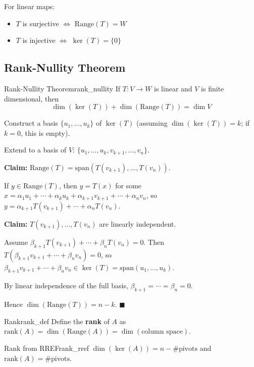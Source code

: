 \documentclass[11pt, letterpaper, openany]{book}
\renewenvironment{proof}[1][\proofname]{%
  \tcolorbox[blanker, breakable, left=1em,
    before skip=1em, after skip=1em,
    borderline west={2pt}{0pt}{MagicTeal!50},
    colback=MagicCream,
    before upper={\textcolor{MagicTeal}{\sffamily\bfseries #1.}\space}
  ]%
}{%
  \hfill\textcolor{MagicTeal}{\ensuremath{\blacksquare}}\endtcolorbox%
}
\begin{document}
\begin{remark}
For linear maps:
\begin{itemize}
    \item $T$ is surjective $\Leftrightarrow$ $\text{Range}(T) = W$
    \item $T$ is injective $\Leftrightarrow$ $\ker(T) = \{0\}$
\end{itemize}
\end{remark}

\subsection{Rank-Nullity Theorem}

\begin{thm}{Rank-Nullity Theorem}{rank_nullity}
If $T: V \to W$ is linear and $V$ is finite dimensional, then
\[\dim(\ker(T)) + \dim(\text{Range}(T)) = \dim V\]
\end{thm}

\begin{proof}
Construct a basis $\{u_1, \ldots, u_k\}$ of $\ker(T)$ (assuming $\dim(\ker(T)) = k$; if $k = 0$, this is empty).

Extend to a basis of $V$: $\{u_1, \ldots, u_k, v_{k+1}, \ldots, v_n\}$.

\textbf{Claim:} $\text{Range}(T) = \text{span}(T(v_{k+1}), \ldots, T(v_n))$.

If $y \in \text{Range}(T)$, then $y = T(x)$ for some $x = \alpha_1 u_1 + \cdots + \alpha_k u_k + \alpha_{k+1} v_{k+1} + \cdots + \alpha_n v_n$, so $y = \alpha_{k+1} T(v_{k+1}) + \cdots + \alpha_n T(v_n)$.

\textbf{Claim:} $T(v_{k+1}), \ldots, T(v_n)$ are linearly independent.

Assume $\beta_{k+1} T(v_{k+1}) + \cdots + \beta_n T(v_n) = 0$. Then $T(\beta_{k+1} v_{k+1} + \cdots + \beta_n v_n) = 0$, so $\beta_{k+1} v_{k+1} + \cdots + \beta_n v_n \in \ker(T) = \text{span}(u_1, \ldots, u_k)$.

By linear independence of the full basis, $\beta_{k+1} = \cdots = \beta_n = 0$.

Hence $\dim(\text{Range}(T)) = n - k$.
\end{proof}

\begin{defn}{Rank}{rank_def}
Define the \textbf{rank} of $A$ as $\text{rank}(A) = \dim(\text{Range}(A)) = \dim(\text{column space})$.
\end{defn}

\begin{lem}{Rank from RREF}{rank_rref}
$\dim(\ker(A)) = n - \#\text{pivots}$ and $\text{rank}(A) = \#\text{pivots}$.
\end{lem}
\end{document}

